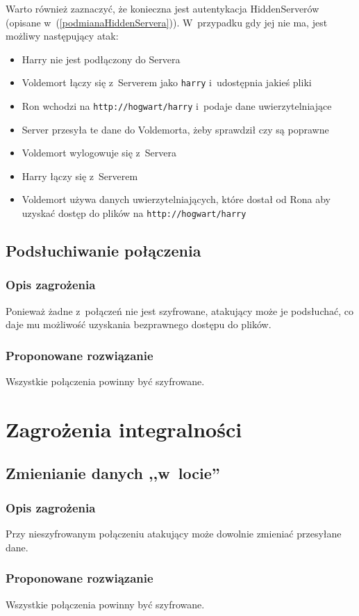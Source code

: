 \documentclass[a4paper,notitlepage]{article}
\begin{document}
Warto również zaznaczyć, że konieczna jest autentykacja HiddenServerów 
(opisane w~(\ref{podmianaHiddenServera})). W~przypadku gdy jej nie ma, 
jest możliwy następujący atak:
\begin{itemize}
\item Harry nie jest podłączony do Servera
\item Voldemort łączy się z~Serverem jako \texttt{harry} i~udostępnia
jakieś pliki
\item Ron wchodzi na \texttt{http://hogwart/harry} i~podaje dane
uwierzytelniające
\item Server przesyła te dane do Voldemorta, żeby sprawdził czy są poprawne
\item Voldemort wylogowuje się z~Servera
\item Harry łączy się z~Serverem
\item Voldemort używa danych uwierzytelniających, które dostał od Rona aby
uzyskać dostęp do plików na \texttt{http://hogwart/harry}
\end{itemize}

\subsection{Podsłuchiwanie połączenia}
\subsubsection*{Opis zagrożenia}
Ponieważ żadne z~połączeń nie jest szyfrowane, atakujący może je podsłuchać,
co daje mu możliwość uzyskania bezprawnego dostępu do plików.
\subsubsection*{Proponowane rozwiązanie}
Wszystkie połączenia powinny być szyfrowane.

\section{Zagrożenia integralności}
\subsection{Zmienianie danych ,,w~locie''}
\subsubsection*{Opis zagrożenia}
Przy nieszyfrowanym połączeniu atakujący może dowolnie zmieniać przesyłane
dane.
\subsubsection*{Proponowane rozwiązanie}
Wszystkie połączenia powinny być szyfrowane.
\end{document}
